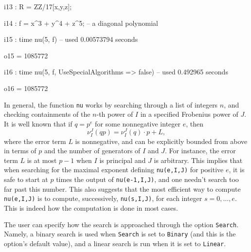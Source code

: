 \documentclass{amsart}
\begin{document}
\bigskip
{\small
{}
\begin{MyVerbatim}
i13 : R = ZZ/17[x,y,z];

i14 : f = x^3 + y^4 + z^5; -- a diagonal polynomial

i15 : time nu(5, f)
     -- used 0.00573794 seconds

o15 = 1085772

i16 : time nu(5, f, UseSpecialAlgorithms => false)
     -- used 0.492965 seconds

o16 = 1085772
\end{MyVerbatim}
}
\bigskip





In general, the function \texttt{nu} works by searching through a list of integers $n$, and checking containments of the $n$-th power of $I$ in a specified Frobenius power of $J$.
It is well known that if $q=p^e$ for some nonnegative integer $e$, then \[ \nu_I^J(qp) = \nu_I^J(q)\cdot p + L,\]  where the error term $L$ is nonnegative, and can be explicitly bounded from above in terms of $p$ and the number of generators of $I$ and $J$.  For instance, the error term $L$ is at most $p-1$ when $I$ is principal and $J$ is arbitrary.
This implies that when searching for the maximal exponent defining \texttt{nu(e,I,J)} for positive $e$, it is safe to start at $p$ times the output of \texttt{nu(e-1,I,J)}, and one needn't search too far past this number.  This also suggests that the most efficient way to compute \texttt{nu(e,I,J)} is to compute, successively, \texttt{nu(s,I,J)}, for each integer $s = 0,\ldots,e$.  This is indeed how the computation is done in most cases.

The user can specify how the search is approached through the  option \texttt{Search}.  Namely, a binary search is used when \texttt{Search} is set to \texttt{Binary} (and this is the option's default value), and a linear search is run when it is set to \texttt{Linear}.
\end{document}
